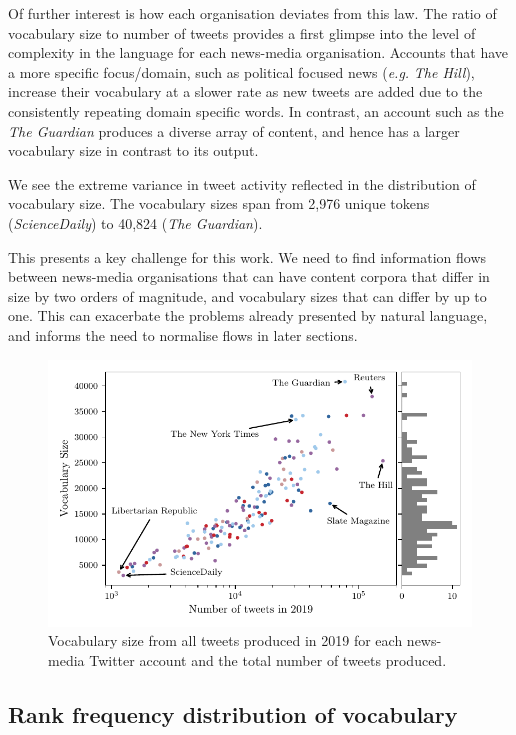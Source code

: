 Of further interest is how each organisation deviates from this law. The ratio of vocabulary size to number of tweets provides a first glimpse into the level of complexity in the language for each news-media organisation. Accounts that have a more specific focus/domain, such as political focused news (\emph{e.g.} \emph{The Hill}), increase their vocabulary at a slower rate as new tweets are added due to the consistently repeating domain specific words. In contrast, an account such as the \emph{The Guardian} produces a diverse array of content, and hence has a larger vocabulary size in contrast to its output.

We see the extreme variance in tweet activity reflected in the distribution of vocabulary size. The vocabulary sizes span from 2,976 unique tokens (\emph{ScienceDaily}) to 40,824 (\emph{The Guardian}). 

This presents a key challenge for this work. We need to find information flows between news-media organisations that can have content corpora that differ in size by two orders of magnitude, and vocabulary sizes that can differ by up to one. This can exacerbate the problems already presented by natural language, and informs the need to normalise flows in later sections.


\begin{figure}[!htbp]
\centering
\includegraphics{chapter1/figs/vocab_vs_activity.pdf}
\caption{Vocabulary size from all tweets produced in 2019 for each news-media Twitter account and the total number of tweets produced.}\label{fig:data_vocabvsactivity}
\end{figure}

\subsection{Rank frequency distribution of vocabulary}\label{sec:zipf_fit}

